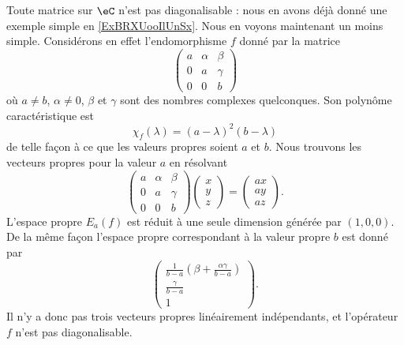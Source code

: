 \begin{remark}  \label{RemBOGooCLMwyb}
    Toute matrice sur \( \eC\) n'est pas diagonalisable : nous en avons déjà donné une exemple simple en \ref{ExBRXUooIlUnSx}. Nous en voyons maintenant un moins simple. Considérons en effet l'endomorphisme \( f\) donné par la matrice
    \begin{equation}
        \begin{pmatrix}
            a&    \alpha    &   \beta    \\
            0    &   a    &   \gamma    \\
            0    &   0    &   b
        \end{pmatrix}
    \end{equation}
    où \( a\neq b\), \( \alpha\neq 0\), \( \beta\) et \( \gamma\) sont des nombres complexes quelconques.
    Son polynôme caractéristique est 
    \begin{equation}
        \chi_f(\lambda)=(a-\lambda)^2(b-\lambda)
    \end{equation}
    de telle façon à ce que les valeurs propres soient \( a\) et \( b\). Nous trouvons les vecteurs propres pour la valeur \( a\) en résolvant
    \begin{equation}
        \begin{pmatrix}
            a    &   \alpha    &   \beta    \\
            0    &   a    &   \gamma    \\
            0    &   0    &   b
        \end{pmatrix}\begin{pmatrix}
            x    \\ 
            y    \\ 
            z    
        \end{pmatrix}=\begin{pmatrix}
            ax    \\ 
            ay    \\ 
            az    
        \end{pmatrix}.
    \end{equation}
    L'espace propre \( E_a(f)\) est réduit à une seule dimension générée par \( (1,0,0)\). De la même façon l'espace propre correspondant à la valeur propre \( b\) est donné par 
    \begin{equation}
        \begin{pmatrix}
            \frac{1}{ b-a }\left( \beta+\frac{ \alpha\gamma }{ b-a } \right)    \\ 
            \frac{ \gamma }{ b-a }    \\ 
            1    
        \end{pmatrix}.
    \end{equation}
    Il n'y a donc pas trois vecteurs propres linéairement indépendants, et l'opérateur \( f\) n'est pas diagonalisable.


\end{remark}
